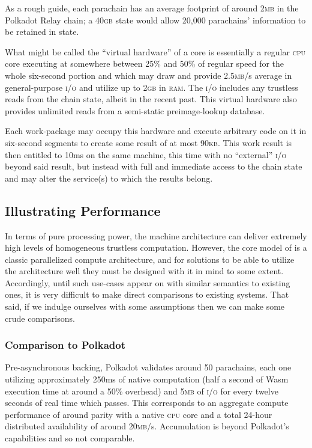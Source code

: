 As a rough guide, each parachain has an average footprint of around 2\textsc{mb} in the Polkadot Relay chain; a 40\textsc{gb} state would allow 20,000 parachains' information to be retained in state.

What might be called the ``virtual hardware'' of a \Jam core is essentially a regular \textsc{cpu} core executing at somewhere between 25\% and 50\% of regular speed for the whole six-second portion and which may draw and provide 2.5\textsc{mb}/s average in general-purpose \textsc{i/o} and utilize up to 2\textsc{gb} in \textsc{ram}. The \textsc{i/o} includes any trustless reads from the \Jam chain state, albeit in the recent past. This virtual hardware also provides unlimited reads from a semi-static preimage-lookup database.

Each work-package may occupy this hardware and execute arbitrary code on it in six-second segments to create some result of at most 90\textsc{kb}. This work result is then entitled to 10ms on the same machine, this time with no ``external'' \textsc{i/o} beyond said result, but instead with full and immediate access to the \Jam chain state and may alter the service(s) to which the results belong.

\subsection{Illustrating Performance}

In terms of pure processing power, the \Jam machine architecture can deliver extremely high levels of homogeneous trustless computation. However, the core model of \Jam is a classic parallelized compute architecture, and for solutions to be able to utilize the architecture well they must be designed with it in mind to some extent. Accordingly, until such use-cases appear on \Jam with similar semantics to existing ones, it is very difficult to make direct comparisons to existing systems. That said, if we indulge ourselves with some assumptions then we can make some crude comparisons.

\subsubsection{Comparison to Polkadot}
Pre-asynchronous backing, Polkadot validates around 50 parachains, each one utilizing approximately 250ms of native computation (\ie half a second of Wasm execution time at around a 50\% overhead) and 5\textsc{mb} of \textsc{i/o} for every twelve seconds of real time which passes. This corresponds to an aggregate compute performance of around parity with a native \textsc{cpu} core and a total 24-hour distributed availability of around 20\textsc{mb}/s. Accumulation is beyond Polkadot's capabilities and so not comparable.

